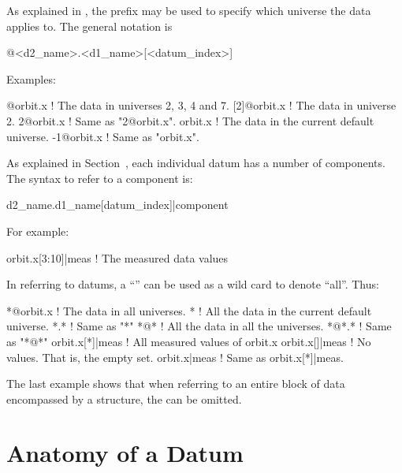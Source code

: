 As explained in , the prefix  may
be used to specify which universe the data applies to. The general notation is
\begin{example}
  @<d2_name>.<d1_name>[<datum_index>]
\end{example}
Examples:
\begin{example}
  [2:4,7]@orbit.x ! The  data in universes 2, 3, 4 and 7.
  [2]@orbit.x     ! The  data in universe 2. 
  2@orbit.x       ! Same as "2@orbit.x".
  orbit.x         ! The  data in the current default universe.
  -1@orbit.x      ! Same as "orbit.x".
\end{example}

As explained in Section~, each individual datum has a number of components. The
syntax to refer to a component is:
\begin{example}
  d2_name.d1_name[datum_index]|component
\end{example}
For example:
\begin{example}
  orbit.x[3:10]|meas     ! The measured data values
\end{example}

In referring to datums, a ``\vn{*}'' can be used as a wild card to 
denote ``all''. Thus:
\begin{example}
  *@orbit.x       ! The  data in all universes.
  *               ! All the data in the current default universe.
  *.*             ! Same as "*"
  *@*             ! All the data in all the universes. 
  *@*.*           ! Same as "*@*"
  orbit.x[*]|meas ! All measured values of orbit.x
  orbit.x[]|meas  ! No values. That is, the empty set.
  orbit.x|meas    ! Same as orbit.x[*]|meas.
\end{example}
The last example shows that when referring to an entire block of data
encompassed by a  structure, the \vn{[*]} can be omitted.

\section{Anatomy of a Datum}
\label{s:data.anatomy}

